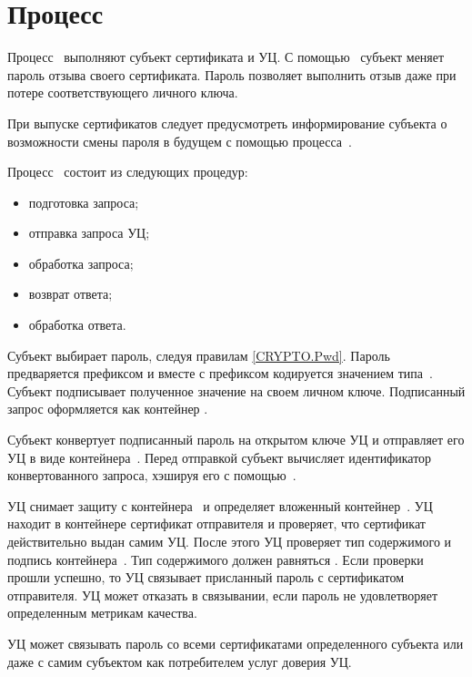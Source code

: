 \section{Процесс }\label{PROCESSES.Setpwd}

Процесс~ выполняют субъект сертификата и УЦ. С
помощью~ субъект меняет пароль отзыва своего сертификата. Пароль
позволяет выполнить отзыв даже при потере соответствующего личного ключа.

При выпуске сертификатов следует предусмотреть информирование субъекта о
возможности смены пароля в будущем с помощью процесса~.

Процесс~ состоит из следующих процедур:
\begin{itemize}
\item
подготовка запроса;
\item
отправка запроса УЦ;
\item
обработка запроса;
\item
возврат ответа;
\item
обработка ответа.
\end{itemize}

Субъект выбирает пароль, следуя правилам \ref{CRYPTO.Pwd}. Пароль предваряется
префиксом  и вместе с префиксом кодируется значением
типа~. Субъект подписывает полученное значение на своем личном
ключе. Подписанный запрос оформляется как контейнер .

Субъект конвертует подписанный пароль на открытом ключе УЦ и отправляет его УЦ в
виде контейнера~. Перед отправкой субъект вычисляет
идентификатор конвертованного запроса, хэшируя его с помощью~.

УЦ снимает защиту с контейнера~ и определяет вложенный
контейнер~. УЦ находит в контейнере сертификат отправителя и
проверяет, что сертификат действительно выдан самим УЦ. После этого УЦ проверяет
тип содержимого и подпись контейнера~. Тип содержимого должен
равняться . Если проверки прошли успешно, то УЦ
связывает присланный пароль с сертификатом отправителя. УЦ может отказать в
связывании, если пароль не удовлетворяет определенным метрикам качества.

\begin{note*}
УЦ может связывать пароль со всеми сертификатами определенного субъекта или даже
с самим субъектом как потребителем услуг доверия УЦ.
\end{note*}


